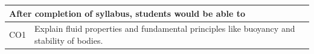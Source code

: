 \documentclass[12pt, a4paper]{article}
\begin{document}
\begin{center}
\begin{tabularx}{\textwidth}{|c|X|}
                                                                                                                                                                                                                                                                                                                                                                                                                                                                                                                                                                                                                                                    \hline
                                                                                                                                                                                                                                                                                                                                                                                                                                                                                                                                                                                                                                                            \multicolumn{2}{|l|}{\textbf{After completion of syllabus, students would be able to}} \\
                                                                                                                                                                                                                                                                                                                                                                                                                                                                                                                                                                                                                                                                    \hline
                                                                                                                                                                                                                                                                                                                                                                                                                                                                                                                                                                                                                                                                            CO1 & Explain fluid properties and fundamental principles like buoyancy and stability of bodies. \\

\end{tabularx}
\end{center}
\end{document}

